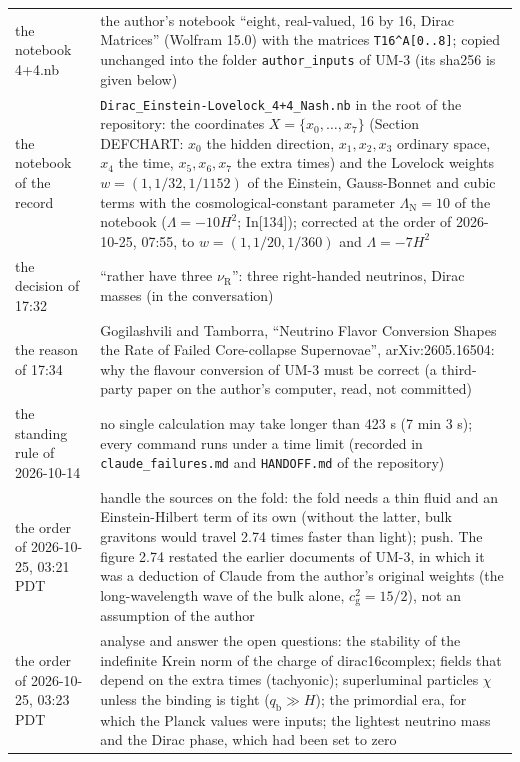 \documentclass[
  10pt,
]{article}
\begin{document}
\begin{longtable}[]{@{}
  >{\raggedright\arraybackslash}p{}
  >{\raggedright\arraybackslash}p{}@{}}
the notebook 4+4.nb & the author's notebook ``eight, real-valued, 16 by
16, Dirac Matrices'' (Wolfram 15.0) with the matrices
\texttt{T16\^{}A{[}0..8{]}}; copied unchanged into the folder
\texttt{author\_inputs} of UM-3 (its sha256 is given below) \\
the notebook of the record &
\texttt{Dirac\_Einstein-Lovelock\_4+4\_Nash.nb} in the root of the
repository: the coordinates \(X = \{x_0, \dots, x_7\}\) (Section
DEFCHART: \(x_0\) the hidden direction, \(x_1, x_2, x_3\) ordinary
space, \(x_4\) the time, \(x_5, x_6, x_7\) the extra times) and the
Lovelock weights \(w = (1, 1/32, 1/1152)\) of the Einstein, Gauss-Bonnet
and cubic terms with the cosmological-constant parameter
\(\Lambda_{\mathrm{N}} = 10\) of the notebook (\(\Lambda = -10H^2\);
In{[}134{]}); corrected at the order of 2026-10-25, 07:55, to
\(w = (1, 1/20, 1/360)\) and \(\Lambda = -7H^2\) \\
the decision of 17:32 & ``rather have three \(\nu_{\mathrm{R}}\)'':
three right-handed neutrinos, Dirac masses (in the conversation) \\
the reason of 17:34 & Gogilashvili and Tamborra, ``Neutrino Flavor
Conversion Shapes the Rate of Failed Core-collapse Supernovae'',
arXiv:2605.16504: why the flavour conversion of UM-3 must be correct (a
third-party paper on the author's computer, read, not committed) \\
the standing rule of 2026-10-14 & no single calculation may take longer
than 423 s (7 min 3 s); every command runs under a time limit (recorded
in \texttt{claude\_failures.md} and \texttt{HANDOFF.md} of the
repository) \\
the order of 2026-10-25, 03:21 PDT & handle the sources on the fold: the
fold needs a thin fluid and an Einstein-Hilbert term of its own (without
the latter, bulk gravitons would travel 2.74 times faster than light);
push. The figure 2.74 restated the earlier documents of UM-3, in which
it was a deduction of Claude from the author's original weights (the
long-wavelength wave of the bulk alone, \(c_{\mathrm{g}}^2 = 15/2\)),
not an assumption of the author \\
the order of 2026-10-25, 03:23 PDT & analyse and answer the open
questions: the stability of the indefinite Krein norm of the charge of
dirac16complex; fields that depend on the extra times (tachyonic);
superluminal particles \(\chi\) unless the binding is tight
(\(q_{\mathrm{b}} \gg H\)); the primordial era, for which the Planck
values were inputs; the lightest neutrino mass and the Dirac phase,
which had been set to zero \\

\end{longtable}
\end{document}
